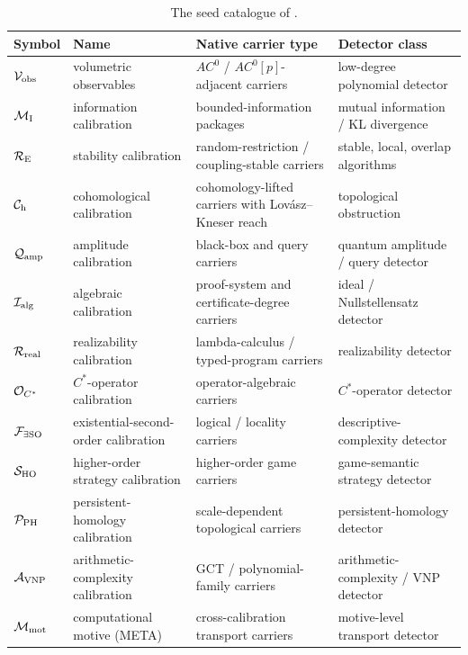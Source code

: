 \begin{table}[H]
  \centering
  \caption{The seed catalogue of .}
  \label{tab:calibration:seed}
  \scriptsize
  \renewcommand{\arraystretch}{1.06}
  \begin{tabularx}{\textwidth}{@{}>{\raggedright\arraybackslash}p{}>{\raggedright\arraybackslash}p{}>{\raggedright\arraybackslash}X>{\raggedright\arraybackslash}p{}@{}}
    \toprule
    Symbol & Name & Native carrier type & Detector class \\
    \midrule
    \(\mathcal{V}_{\text{obs}}\) & volumetric observables & \(AC^0\) / \(AC^0[p]\)-adjacent carriers & low-degree polynomial detector \\
    \(\mathcal{M}_{\text{I}}\) & information calibration & bounded-information packages & mutual information / KL divergence \\
    \(\mathcal{R}_{\text{E}}\) & stability calibration & random-restriction / coupling-stable carriers & stable, local, overlap algorithms \\
    \(\mathcal{C}_{\text{h}}\) & cohomological calibration & cohomology-lifted carriers with Lov\'asz--Kneser reach & topological obstruction \\
    \(\mathcal{Q}_{\text{amp}}\) & amplitude calibration & black-box and query carriers & quantum amplitude / query detector \\
    \(\mathcal{I}_{\text{alg}}\) & algebraic calibration & proof-system and certificate-degree carriers & ideal / Nullstellensatz detector \\
    \(\mathcal{R}_{\text{real}}\) & realizability calibration & lambda-calculus / typed-program carriers & realizability detector \\
    \(\mathcal{O}_{C^*}\) & \(C^*\)-operator calibration & operator-algebraic carriers & \(C^*\)-operator detector \\
    \(\mathcal{F}_{\exists \mathrm{SO}}\) & existential-second-order calibration & logical / locality carriers & descriptive-complexity detector \\
    \(\mathcal{S}_{\mathrm{HO}}\) & higher-order strategy calibration & higher-order game carriers & game-semantic strategy detector \\
    \(\mathcal{P}_{\mathrm{PH}}\) & persistent-homology calibration & scale-dependent topological carriers & persistent-homology detector \\
    \(\mathcal{A}_{\mathrm{VNP}}\) & arithmetic-complexity calibration & GCT / polynomial-family carriers & arithmetic-complexity / VNP detector \\
    \(\mathcal{M}_{\text{mot}}\) & computational motive (META) & cross-calibration transport carriers & motive-level transport detector \\
    \bottomrule
  \end{tabularx}
\end{table}

